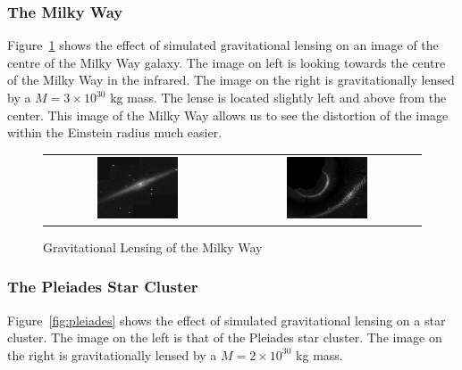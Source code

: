 \documentclass[a4paper]{IEEEtran}
\begin{document}
\subsubsection{The Milky Way}
Figure~\ref{fig:milky-way} shows the effect of simulated gravitational lensing
on an image of the centre of the Milky Way galaxy. 
The image on left is looking towards the centre of the Milky Way in the
infrared. The image on the right is gravitationally lensed by a 
$M = 3 \times 10^{30}$ kg mass. The lense is located slightly left and above
from the center. This image of the Milky Way allows us to see the distortion
of the image within the Einstein radius much easier.

\begin{figure}
    \caption{Gravitational Lensing of the Milky Way} 
    \label{fig:milky-way} 
    \begin{center}
        \begin{tabular}{cc}
            \includegraphics[width=0.45\textwidth]{Pics/milky.eps} &
            \includegraphics[width=0.45\textwidth]{Pics/milky3e30.eps} 
        \end{tabular}
    \end{center}
\end{figure}

\subsubsection{The Pleiades Star Cluster}
Figure~\ref{fig:pleiades} shows the effect of simulated gravitational lensing
on a star cluster. 
The image on the left is that of the Pleiades star cluster. The image
on the right is gravitationally lensed by a $M = 2 \times 10^{30}$ kg
mass.
\end{document}
